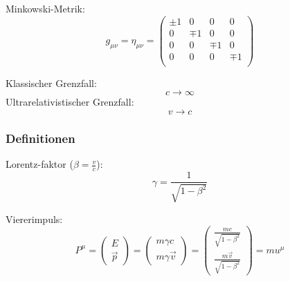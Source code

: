 \documentclass[11pt]{article}
\numberwithin{equation}{section}
\begin{document}
        Minkowski-Metrik:
        \begin{equation}
          g_{\mu\nu} = \eta_{\mu\nu}
          = \left( \begin{matrix}
            \pm1 & 0    & 0    & 0    \\
            0    & \mp1 & 0    & 0    \\
            0    & 0    & \mp1 & 0    \\
            0    & 0    & 0    & \mp1 \\
          \end{matrix} \right)
        \end{equation}

        Klassischer Grenzfall:
        \begin{equation}
          c \rightarrow \infty
        \end{equation}
        Ultrarelativistischer Grenzfall:
        \begin{equation}
          v\rightarrow c
        \end{equation}

        \subsubsection{Definitionen}
          Lorentz-faktor ($\beta = \frac{v}{c}$):
          \begin{equation}
            \gamma = \frac{1}{\sqrt{1-\beta^2}}
          \end{equation}

          Viererimpuls:
          \begin{equation}
            P^\mu =
            \left(\begin{matrix}
              E \\ \vec{p}
            \end{matrix}\right)
            = \left(\begin{matrix}
              m\gamma c \\ m\gamma\vec{v}
            \end{matrix}\right)
            = \left(\begin{matrix}
              \frac{mc}{\sqrt{1-\beta^2}} \\ \frac{m\vec{v}}{\sqrt{1-\beta^2}}
            \end{matrix}\right)
            = m u^\mu
          \end{equation}
\end{document}
